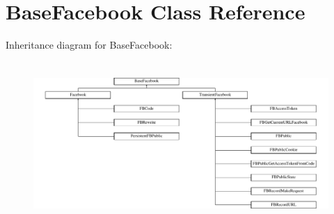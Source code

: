 \hypertarget{classBaseFacebook}{\section{Base\-Facebook Class Reference}
\label{classBaseFacebook}
}
Inheritance diagram for Base\-Facebook\-:\begin{figure}[H]
\begin{center}
\leavevmode
\includegraphics[height=6.222222cm]{classBaseFacebook}
\end{center}
\end{figure}
